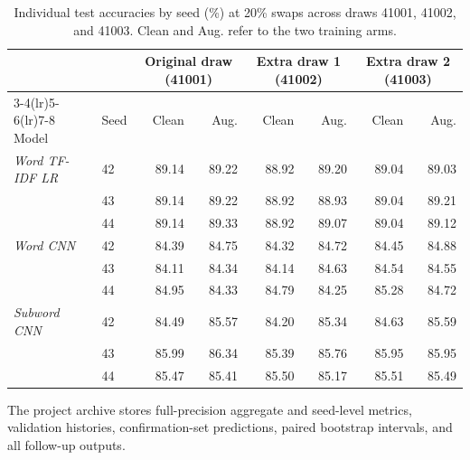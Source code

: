 \begin{table}[H]
\centering\small
\begin{tabular}{@{}llrrrrrr@{}}
\toprule
 & & \multicolumn{2}{c}{Original draw (41001)} & \multicolumn{2}{c}{Extra draw 1 (41002)} & \multicolumn{2}{c}{Extra draw 2 (41003)} \\
\cmidrule(lr){3-4}\cmidrule(lr){5-6}\cmidrule(lr){7-8}
Model & Seed & Clean & Aug. & Clean & Aug. & Clean & Aug. \\
\midrule
\textit{Word TF-IDF LR} & 42 & 89.14 & 89.22 & 88.92 & 89.20 & 89.04 & 89.03 \\
 & 43 & 89.14 & 89.22 & 88.92 & 88.93 & 89.04 & 89.21 \\
 & 44 & 89.14 & 89.33 & 88.92 & 89.07 & 89.04 & 89.12 \\
\addlinespace
\textit{Word CNN} & 42 & 84.39 & 84.75 & 84.32 & 84.72 & 84.45 & 84.88 \\
 & 43 & 84.11 & 84.34 & 84.14 & 84.63 & 84.54 & 84.55 \\
 & 44 & 84.95 & 84.33 & 84.79 & 84.25 & 85.28 & 84.72 \\
\addlinespace
\textit{Subword CNN} & 42 & 84.49 & 85.57 & 84.20 & 85.34 & 84.63 & 85.59 \\
 & 43 & 85.99 & 86.34 & 85.39 & 85.76 & 85.95 & 85.95 \\
 & 44 & 85.47 & 85.41 & 85.50 & 85.17 & 85.51 & 85.49 \\
\bottomrule
\end{tabular}
\caption[Per-seed accuracies across draws]{Individual test accuracies by seed (\%) at 20\% swaps across draws 41001, 41002, and 41003. Clean and Aug. refer to the two training arms.}
\label{tab:app-seed-draws}
\end{table}
The project archive stores full-precision aggregate and seed-level metrics, validation histories, confirmation-set predictions, paired bootstrap intervals, and all follow-up outputs.
\endgroup
